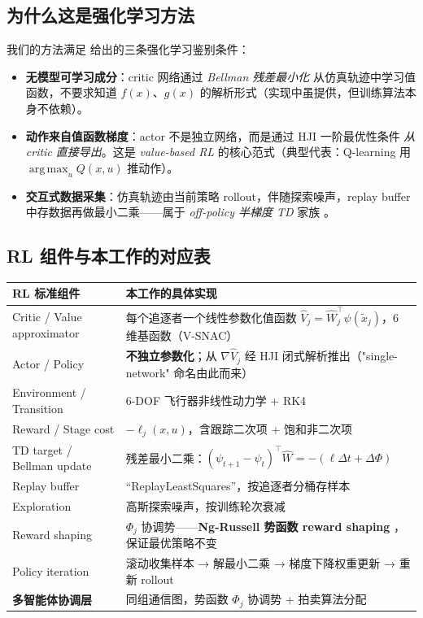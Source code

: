 \documentclass[11pt,a4paper]{article}
\DeclareMathOperator*{\argmax}{arg\,max}
\theoremstyle{remark}
\begin{document}
\subsection{为什么这是强化学习方法}

我们的方法满足 \cite{sutton2018reinforcement} 给出的三条强化学习鉴别条件：

\begin{itemize}
\item \textbf{无模型可学习成分}：critic 网络通过 \emph{Bellman 残差最小化} 从仿真轨迹中学习值函数，不要求知道 $f(x)$、$g(x)$ 的解析形式（实现中虽提供，但训练算法本身不依赖）。
\item \textbf{动作来自值函数梯度}：actor 不是独立网络，而是通过 HJI 一阶最优性条件 \emph{从 critic 直接导出}。这是 \emph{value-based RL} 的核心范式（典型代表：Q-learning 用 $\argmax_u Q(x,u)$ 推动作）。
\item \textbf{交互式数据采集}：仿真轨迹由当前策略 rollout，伴随探索噪声，replay buffer 中存数据再做最小二乘——属于 \emph{off-policy 半梯度 TD} 家族 \cite{lewis2009adaptive}。
\end{itemize}

\subsection{RL 组件与本工作的对应表}

\begin{tabular}{p{4.6cm}|p{8.4cm}}
\hline
RL 标准组件 & 本工作的具体实现 \\
\hline
Critic / Value approximator & 每个追逐者一个线性参数化值函数 $\hat V_j=\hat W_j^\top\psi(\tilde x_j)$，6 维基函数（V-SNAC）\\
Actor / Policy & \textbf{不独立参数化}；从 $\nabla\hat V_j$ 经 HJI 闭式解析推出（"single-network" 命名由此而来）\\
Environment / Transition & 6-DOF 飞行器非线性动力学 + RK4 \\
Reward / Stage cost & $-\ell_j(x,u)$，含跟踪二次项 + 饱和非二次项 \\
TD target / Bellman update & 残差最小二乘：$(\psi_{t+1}-\psi_t)^\top \hat W=-(\ell\Delta t+\Delta\Phi)$ \\
Replay buffer & ``ReplayLeastSquares''，按追逐者分桶存样本 \\
Exploration & 高斯探索噪声，按训练轮次衰减 \\
Reward shaping & $\Phi_j$ 协调势——\textbf{Ng-Russell 势函数 reward shaping} \cite{ng1999policy}，保证最优策略不变 \\
Policy iteration & 滚动收集样本 → 解最小二乘 → 梯度下降权重更新 → 重新 rollout \\
\textbf{多智能体协调层} & 同组通信图，势函数 $\Phi_j$ 协调势 + 拍卖算法分配 \\
\hline
\end{tabular}
\end{document}

